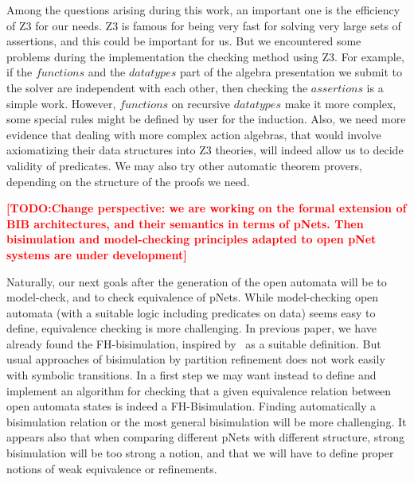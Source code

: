 \documentclass{lncs/llncs}
\newcommand{\TODO}[1]{\textcolor{red}{\textbf{[TODO:#1]}}}
\begin{document}
Among the questions arising during this work, an important one is the
efficiency of Z3 for our needs. Z3 is famous for being very fast for
solving very large sets of assertions, and this could be important for
us. But we encountered  some problems during the implementation the
checking method using Z3. For example, if the $functions$ and the
$datatypes$ part of the algebra presentation we submit to the solver
are independent with each other, then checking the $assertions$ is a
simple work. However, $functions$ on recursive $datatypes$ make it
more complex, some special rules might be defined by user for the
induction. Also, we need more evidence that dealing with more complex
action algebras, that would involve axiomatizing their data structures
into Z3 theories, will indeed allow us to decide validity of
predicates.
We may also try other automatic theorem provers, depending on the structure of the proofs we need.

\TODO{Change perspective: we are working on the formal extension of
  BIB architectures, and their semantics in terms of pNets. Then
  bisimulation and model-checking principles adapted to open pNet
  systems are under development}

Naturally, our next goals after the generation of the open automata
will be to model-check, and to check equivalence of  pNets. While
model-checking open automata (with a suitable logic including
predicates on data) seems easy to define, equivalence checking is more challenging.
In previous paper, we
have already found the FH-bisimulation, inspired by~\cite{deSimone85} as a
suitable definition. But usual approaches of bisimulation by partition
refinement does not work easily with symbolic transitions. In a first
step we may want instead to define and implement an algorithm for
checking that a given equivalence relation between open automata 
states is indeed a FH-Bisimulation. Finding automatically a
bisimulation relation or the most general bisimulation will be more
challenging. It appears also that when comparing different pNets with
different structure, strong bisimulation will be too strong a notion,
and that we will have to define proper notions of weak equivalence or
refinements. 
\end{document}

